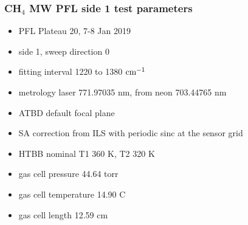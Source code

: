 \documentclass[10pt]{beamer}
\begin{document}
\begin{frame}
\frametitle{CH$_4$ MW PFL side 1 test parameters}

\begin{itemize}
  \item PFL Plateau 20, 7-8 Jan 2019
  \item side 1, sweep direction 0
  \item fitting interval 1220 to 1380 $\mbox{cm$^{-1}$}$
  \item metrology laser 771.97035 nm, from neon 703.44765 nm
  \item ATBD default focal plane
  \item SA correction from ILS with periodic sinc at the sensor grid
  \item HTBB nominal T1 360 K, T2 320 K
  \item gas cell pressure 44.64 torr
  \item gas cell temperature 14.90 C
  \item gas cell length 12.59 cm
\end{itemize}

\end{frame}
\end{document}

